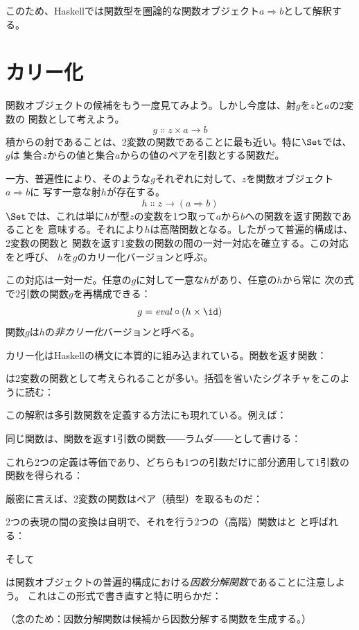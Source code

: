 このため、Haskellでは関数型を圏論的な関数オブジェクト$a \Rightarrow b$として解釈する。

\section{カリー化}

関数オブジェクトの候補をもう一度見てみよう。しかし今度は、射$g$を$z$と$a$の2変数の
関数として考えよう。
\[g \Colon z \times a \to b\]
積からの射であることは、2変数の関数であることに最も近い。特に$\Set$では、$g$は
集合$z$からの値と集合$a$からの値のペアを引数とする関数だ。

一方、普遍性により、そのような$g$それぞれに対して、$z$を関数オブジェクト$a \Rightarrow b$に
写す一意な射$h$が存在する。
\[h \Colon z \to (a \Rightarrow b)\]
$\Set$では、これは単に$h$が型$z$の変数を1つ取って$a$から$b$への関数を返す関数であることを
意味する。それにより$h$は高階関数となる。したがって普遍的構成は、2変数の関数と
関数を返す1変数の関数の間の一対一対応を確立する。この対応をと呼び、
$h$を$g$のカリー化バージョンと呼ぶ。

この対応は一対一だ。任意の$g$に対して一意な$h$があり、任意の$h$から常に
次の式で2引数の関数$g$を再構成できる：
\[g = \mathit{eval} \circ (h \times \id)\]
関数$g$は$h$の\emph{非カリー化}バージョンと呼べる。

カリー化はHaskellの構文に本質的に組み込まれている。関数を返す関数：

は2変数の関数として考えられることが多い。括弧を省いたシグネチャをこのように読む：

この解釈は多引数関数を定義する方法にも現れている。例えば：

同じ関数は、関数を返す1引数の関数――ラムダ――として書ける：

これら2つの定義は等価であり、どちらも1つの引数だけに部分適用して1引数の関数を得られる：

厳密に言えば、2変数の関数はペア（積型）を取るものだ：

2つの表現の間の変換は自明で、それを行う2つの（高階）関数はと
と呼ばれる：

そして

は関数オブジェクトの普遍的構成における\emph{因数分解関数}であることに注意しよう。
これはこの形式で書き直すと特に明らかだ：

（念のため：因数分解関数は候補から因数分解する関数を生成する。）

